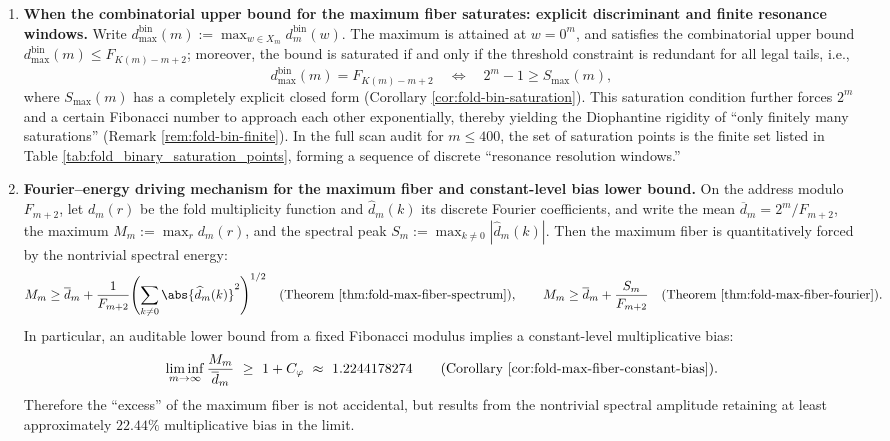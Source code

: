 \begin{enumerate}
  \item \textbf{When the combinatorial upper bound for the maximum fiber saturates: explicit discriminant and finite resonance windows.}
  Write
  \(d^{\mathrm{bin}}_{\max}(m):=\max_{w\in X_m}d^{\mathrm{bin}}_m(w)\).
  The maximum is attained at \(w=0^m\), and satisfies the combinatorial upper bound
  \(d^{\mathrm{bin}}_{\max}(m)\le F_{K(m)-m+2}\);
  moreover, the bound is saturated if and only if the threshold constraint is redundant for all legal tails, i.e.,
  \[
  d^{\mathrm{bin}}_{\max}(m)=F_{K(m)-m+2}
  \quad\Longleftrightarrow\quad
  2^m-1\ge S_{\max}(m),
  \]
  where \(S_{\max}(m)\) has a completely explicit closed form (Corollary \ref{cor:fold-bin-saturation}).
  This saturation condition further forces \(2^m\) and a certain Fibonacci number to approach each other exponentially, thereby yielding the Diophantine rigidity of ``only finitely many saturations'' (Remark \ref{rem:fold-bin-finite}).
  In the full scan audit for \(m\le 400\), the set of saturation points is the finite set listed in Table \ref{tab:fold_binary_saturation_points}, forming a sequence of discrete ``resonance resolution windows.''

  \item \textbf{Fourier--energy driving mechanism for the maximum fiber and constant-level bias lower bound.}
  On the address modulo \(F_{m+2}\), let \(d_m(r)\) be the fold multiplicity function and \(\widehat d_m(k)\) its discrete Fourier coefficients,
  and write the mean \(\overline d_m=2^m/F_{m+2}\), the maximum \(M_m:=\max_r d_m(r)\), and the spectral peak \(S_m:=\max_{k\neq 0}|\widehat d_m(k)|\).
  Then the maximum fiber is quantitatively forced by the nontrivial spectral energy:
  \[
  M_m\ge \overline d_m+\frac{1}{F_{m+2}}\Biggl(\sum_{k\ne 0}\abs{\widehat d_m(k)}^2\Biggr)^{1/2}
  \quad\text{(Theorem \ref{thm:fold-max-fiber-spectrum})},
  \qquad
  M_m\ge \overline d_m+\frac{S_m}{F_{m+2}}
  \quad\text{(Theorem \ref{thm:fold-max-fiber-fourier})}.
  \]
  In particular, an auditable lower bound from a fixed Fibonacci modulus implies a constant-level multiplicative bias:
  \[
  \liminf_{m\to\infty}\frac{M_m}{\overline d_m}\ \ge\ 1+C_\varphi\ \approx\ 1.2244178274
  \qquad\text{(Corollary \ref{cor:fold-max-fiber-constant-bias})}.
  \]
  Therefore the ``excess'' of the maximum fiber is not accidental, but results from the nontrivial spectral amplitude retaining at least approximately \(22.44\%\) multiplicative bias in the limit.


\end{enumerate}
